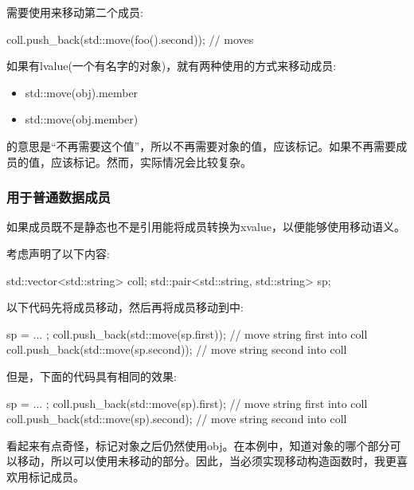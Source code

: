 需要使用来移动第二个成员:

\begin{cppcode}
coll.push_back(std::move(foo().second)); // moves
\end{cppcode}

如果有lvalue(一个有名字的对象)，就有两种使用的方式来移动成员:

\begin{itemize}
	\item std::move(obj).member
	\item std::move(obj.member)
\end{itemize}

的意思是“不再需要这个值”，所以不再需要对象的值，应该标记。如果不再需要成员的值，应该标记。然而，实际情况会比较复杂。

\subsubsection{用于普通数据成员}

如果成员既不是静态也不是引用能将成员转换为xvalue，以便能够使用移动语义。

考虑声明了以下内容:

\begin{cppcode}
std::vector<std::string> coll;
std::pair<std::string, std::string> sp;
\end{cppcode}

以下代码先将成员移动，然后再将成员移动到中:

\begin{cppcode}
sp = ... ;
coll.push_back(std::move(sp.first)); // move string first into coll
coll.push_back(std::move(sp.second)); // move string second into coll
\end{cppcode}

但是，下面的代码具有相同的效果:

\begin{cppcode}
sp = ... ;
coll.push_back(std::move(sp).first); // move string first into coll
coll.push_back(std::move(sp).second); // move string second into coll
\end{cppcode}

看起来有点奇怪，标记对象之后仍然使用obj。在本例中，知道对象的哪个部分可以移动，所以可以使用未移动的部分。因此，当必须实现移动构造函数时，我更喜欢用标记成员。

